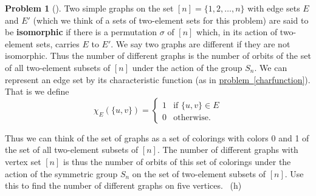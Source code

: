 \documentclass[10pt,]{book}
\newcommand{\terminology}[1]{\textbf{#1}}
\theoremstyle{plain}
\theoremstyle{definition}
\newtheorem{activity}[project]{Problem}
\theoremstyle{definition}
\numberwithin{equation}{chapter}
\newcommand{\importantarrow}{\Rightarrow}
\newcommand{\amp}{&}
\begin{document}
\begin{activity}[]\marginsymbol[-1em]{\pdftooltip{$\importantarrow$}{especially interesting}} \label{activity-327}
\hypertarget{p-1806}{}%
Two simple graphs on the set \([n]= \{1,2,\ldots, n\}\) with edge sets \(E\) and \(E'\) (which we think of a sets of two-element sets for this problem) are said to be \terminology{isomorphic} if there is a permutation \(\sigma\) of \([n]\) which, in its action of two-element sets, carries \(E\) to \(E'\). We say two graphs are different if they are not isomorphic. Thus the number of different graphs is the number of orbits of the set of all two-element subsets of \([n]\) under the action of the group \(S_n\). We can represent an edge set by its characteristic function (as in \hyperref[charfunction]{problem~\ref{charfunction}}). That is we define%
\begin{equation*}
\chi_E(\{u,v\}) = \left\{
\begin{array}{ll}
1 \amp  \mbox{if \(\{u,v\}\in E\)} \\
0 \amp  \mbox{otherwise.}
\end{array} \right.
\end{equation*}
%
\par
\hypertarget{p-1807}{}%
Thus we can think of the set of graphs as a set of colorings with colors 0 and 1 of the set of all two-element subsets of \([n]\). The number of different graphs with vertex set \([n]\) is thus the number of orbits of this set of colorings under the action of the symmetric group \(S_n\) on the set of two-element subsets of \([n]\). Use this to find the number of different graphs on five vertices.%
~{\tiny (h)}\end{activity}
\typeout{************************************************}
\typeout{************************************************}
\end{document}
